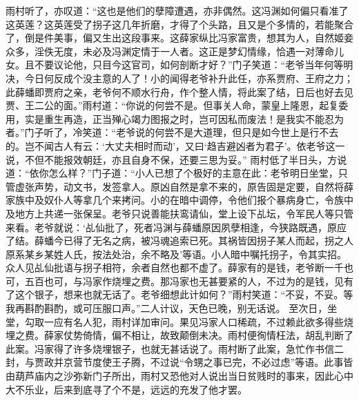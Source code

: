 \documentclass[12pt,oneside]{book}
\begin{document}
雨村听了，亦叹道：“这也是他们的孽障遭遇，亦非偶然。这冯渊如何偏只看准了这英莲？这英莲受了拐子这几年折磨，才得了个头路，且又是个多情的，若能聚合了，倒是件美事，偏又生出这段事来。这薛家纵比冯家富贵，想其为人，自然姬妾众多，淫佚无度，未必及冯渊定情于一人者。这正是梦幻情缘，恰遇一对薄命儿女。且不要议论他，只目今这官司，如何剖断才好？”门子笑道：“老爷当年何等明决，今日何反成个没主意的人了！小的闻得老爷补升此任，亦系贾府、王府之力；此薛蟠即贾府之亲，老爷何不顺水行舟，作个整人情，将此案了结，日后也好去见贾、王二公的面。”雨村道：“你说的何尝不是。但事关人命，蒙皇上隆恩，起复委用，实是重生再造，正当殚心竭力图报之时，岂可因私而废法！是我实不能忍为者。”门子听了，冷笑道：“老爷说的何尝不是大道理，但只是如今世上是行不去的。岂不闻古人有云：‘大丈夫相时而动’，又曰‘趋吉避凶者为君子’。依老爷这一说，不但不能报效朝廷，亦且自身不保，还要三思为妥。”
雨村低了半日头，方说道：“依你怎么样？”门子道：“小人已想了个极好的主意在此：老爷明日坐堂，只管虚张声势，动文书，发签拿人。原凶自然是拿不来的，原告固是定要，自然将薛家族中及奴仆人等拿几个来拷问。小的在暗中调停，令他们报个暴病身亡，令族中及地方上共递一张保呈。老爷只说善能扶鸾请仙，堂上设下乩坛，令军民人等只管来看。老爷就说：‘乩仙批了，死者冯渊与薛蟠原因夙孽相逢，今狭路既遇，原应了结。薛蟠今已得了无名之病，被冯魂追索已死。其祸皆因拐子某人而起，拐之人原系某乡某姓人氏，按法处治，余不略及’等语。小人暗中嘱托拐子，令其实招。众人见乩仙批语与拐子相符，余者自然也都不虚了。薛家有的是钱，老爷断一千也可，五百也可，与冯家作烧埋之费。那冯家也无甚要紧的人，不过为的是钱，见有了这个银子，想来也就无话了。老爷细想此计如何？”雨村笑道：“不妥，不妥。等我再斟酌斟酌，或可压服口声。”二人计议，天色已晚，别无话说。
至次日，坐堂，勾取一应有名人犯，雨村详加审问。果见冯家人口稀疏，不过赖此欲多得些烧埋之费。薛家仗势倚情，偏不相让，故致颠倒未决。雨村便徇情枉法，胡乱判断了此案。冯家得了许多烧埋银子，也就无甚话说了。雨村断了此案，急忙作书信二封，与贾政并京营节度使王子腾，不过说“令甥之事已完，不必过虑”等语。此事皆由葫芦庙内之沙弥新门子所出，雨村又恐他对人说出当日贫贱时的事来，因此心中大不乐业，后来到底寻了个不是，远远的充发了他才罢。
\end{document}
